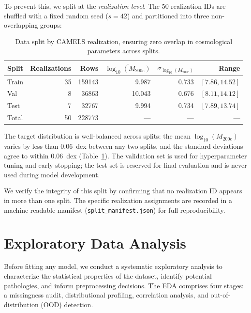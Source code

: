 \documentclass[12pt, a4paper]{article}
\newcommand{\logMhalo}{\log_{10}(M_{200\mathrm{c}})}
\begin{document}
To prevent this, we split at the \emph{realization level}.  The 50 realization IDs are shuffled with a fixed random seed ($s = 42$) and partitioned into three non-overlapping groups:

\begin{table}[H]
  \centering
  \caption{Data split by CAMELS realization, ensuring zero overlap in cosmological parameters across splits.}
  \label{tab:splits}
  \begin{tabular}{@{}lrrrrr@{}}
    \toprule
    Split & Realizations & Rows & $\overline{\logMhalo}$ & $\sigma_{\logMhalo}$ & Range \\
    \midrule
    Train & 35 & \num{159143} & 9.987 & 0.733 & $[7.86, 14.52]$ \\
    Val   &  8 &  \num{36863} & 10.043 & 0.676 & $[8.11, 14.12]$ \\
    Test  &  7 &  \num{32767} & 9.994 & 0.734 & $[7.89, 13.74]$ \\
    \midrule
    Total & 50 & \num{228773} & --- & --- & --- \\
    \bottomrule
  \end{tabular}
\end{table}

The target distribution is well-balanced across splits: the mean $\logMhalo$ varies by less than 0.06~dex between any two splits, and the standard deviations agree to within 0.06~dex (Table~\ref{tab:splits}).  The validation set is used for hyperparameter tuning and early stopping; the test set is reserved for final evaluation and is never used during model development.

We verify the integrity of this split by confirming that no realization ID appears in more than one split.  The specific realization assignments are recorded in a machine-readable manifest (\texttt{split\_manifest.json}) for full reproducibility.

\section{Exploratory Data Analysis}
\label{sec:eda}

Before fitting any model, we conduct a systematic exploratory analysis to characterize the statistical properties of the dataset, identify potential pathologies, and inform preprocessing decisions.  The EDA comprises four stages: a missingness audit, distributional profiling, correlation analysis, and out-of-distribution (OOD) detection.
\end{document}
